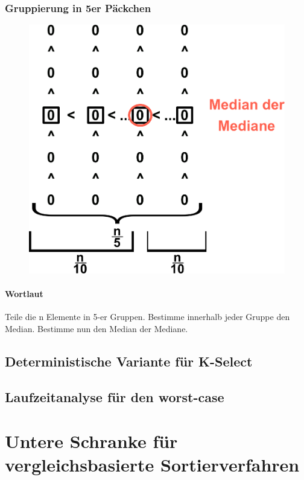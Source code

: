 \subsubsection*{Gruppierung in 5er Päckchen}
\begin{figure}
\vspace{-40pt}
\includegraphics[width=\linewidth]{8/Grafik/img1.png}
\caption{}
\end{figure}

\vspace{30pt}
\paragraph{Wortlaut}
Teile die n Elemente in 5-er Gruppen. Bestimme innerhalb jeder Gruppe den Median. Bestimme nun den Median der Mediane.
\vspace{50pt}


\newpage


\subsection{Deterministische Variante für K-Select}

\subsection{Laufzeitanalyse für den worst-case}


\section{Untere Schranke für vergleichsbasierte Sortierverfahren}